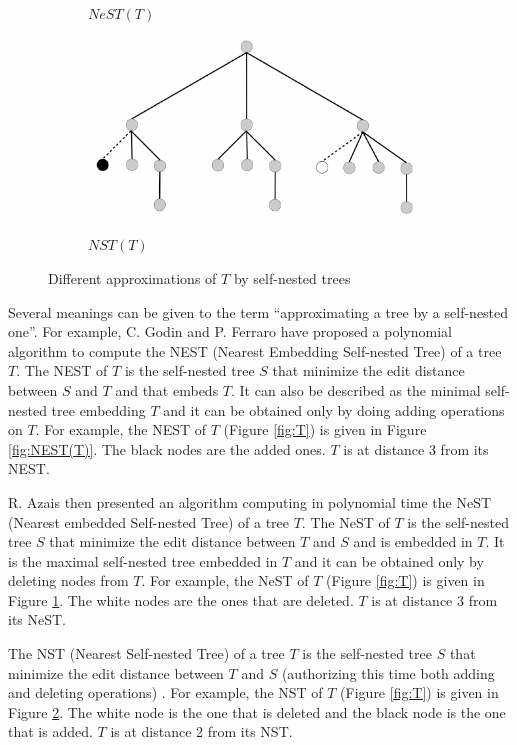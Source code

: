 \begin{figure}
\begin{subfigure}[b]{0.475\textwidth}
    \caption{$NeST(T)$}    
    \label{fig:NeST(T)}
  \end{subfigure}
  \quad
  \begin{subfigure}[b]{0.475\textwidth}   
    \centering 
    \includegraphics[width=\textwidth]{figures/NST(T).pdf}
    \caption{$NST(T)$}    
    \label{fig:NST(T)}
  \end{subfigure}
  \caption{Different approximations of $T$ by self-nested trees} 
  \label{fig:approx}
\end{figure}
    
Several meanings can be given to the term ``approximating a tree by a
self-nested one''. For example, C. Godin and P. Ferraro have proposed a
polynomial algorithm \cite{godin} to compute the NEST (Nearest
Embedding Self-nested Tree) of a tree $T$. The NEST of $T$ is the
self-nested tree $S$ that minimize the edit distance between $S$ and
$T$ and that embeds $T$. It can also be described as the minimal
self-nested tree embedding $T$ and it can be obtained only by doing
adding operations on $T$.
For example, the NEST of $T$ (Figure \ref{fig:T}) is given in Figure
\ref{fig:NEST(T)}. The black nodes are the added ones. $T$ is at
distance 3 from its NEST. 

R. Azais then presented an algorithm \cite{romain} computing in
polynomial time the NeST (Nearest embedded
Self-nested Tree) of a tree $T$. The NeST of $T$ is the self-nested tree $S$ that
minimize the edit distance between $T$ and $S$ and is embedded in
$T$. It is the maximal self-nested tree embedded in $T$ and it can be
obtained only by deleting nodes from $T$. %
For example, the NeST of $T$ (Figure \ref{fig:T}) is given in Figure
\ref{fig:NeST(T)}. The white nodes are the ones that are deleted. $T$
is at distance 3 from its NeST. 

The NST (Nearest Self-nested Tree) of a tree $T$ is the self-nested
tree $S$ that minimize the edit distance between $T$ and $S$
(authorizing this time both adding and deleting operations)
\cite{godin}.  For example, the NST of $T$ (Figure \ref{fig:T}) is
given in Figure \ref{fig:NST(T)}. The white node is the one that is
deleted and the black node is the one that is added. $T$ is at
distance 2 from its NST.

